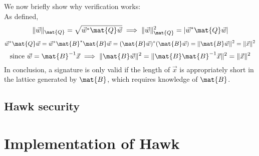 We now briefly show why verification works: \\
As defined, 
\[
    \lVert \vec{w} \rVert_{\mat{Q}} = \sqrt{\vec{w}^* \mat{Q} \vec{w}} \implies \lVert \vec{w} \rVert_{\mat{Q}} ^2 = |\vec{w}^* \mat{Q} \vec{w}| \\
\]
\[
    \vec{w}^* \mat{Q} \vec{w} = \vec{w}^* \mat{B}^* \mat{B} \vec{w} = (\mat{B} \vec{w})^* (\mat{B} \vec{w}) = \lVert \mat{B} \vec{w} \rVert ^2
    = \lVert \vec{x} \rVert ^2
\]
\[
    \text{since } \vec{w} = \mat{B}^{-1} \vec{x} \implies \lVert \mat{B} \vec{w} \rVert ^2 = \lVert \mat{B} \mat{B}^{-1} \vec{x} \rVert ^2 = \lVert \vec{x} \rVert ^2
\]
In conclusion, a signature is only valid if the length of $\vec{x}$ is appropriately short in the lattice generated by $\mat{B}$, which requires knowledge of $\mat{B}$.
\subsection{Hawk security}
\section{Implementation of Hawk}

